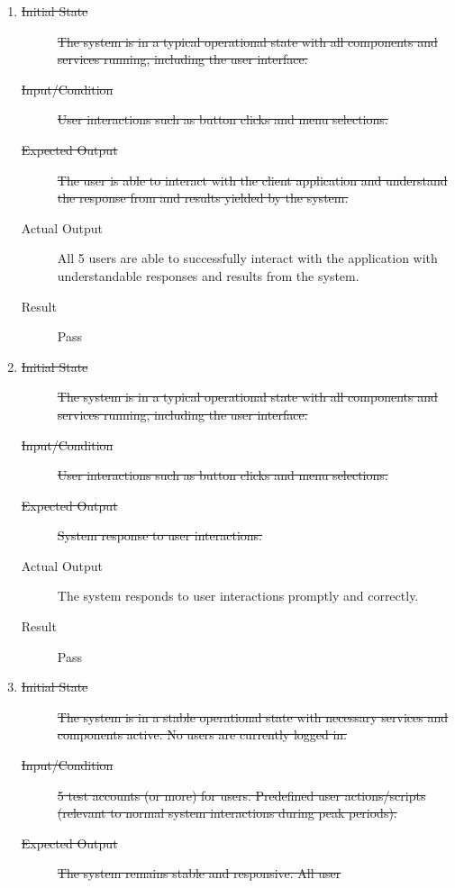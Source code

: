 \documentclass[12pt, titlepage]{article}
\begin{document}
\begin{enumerate}[NFR-T1]
  \item \label{NFRT1}
    \begin{description}
    \item[\sout{Initial State}]\sout{ The system is in a typical operational state with all
      components and services running, including the user interface.
    }
		\item[\sout{Input/Condition}]\sout{ User interactions such as button clicks and menu
      selections.
    }
		\item[\sout{Expected Output}]\sout{ The user is able to interact with the client application
      and understand the response from and results yielded by the system.
    }
		\item[Actual Output] All 5 users are able to successfully interact with the
      application with understandable responses and results from the system.
    \item[Result] Pass
    \end{description}
  \item \label{NFRT2}
    \begin{description}
    \item[\sout{Initial State}]\sout{ The system is in a typical operational state with all
      components and services running, including the user interface.
    }
		\item[\sout{Input/Condition}]\sout{ User interactions such as button clicks and menu
      selections.
    }
		\item[\sout{Expected Output}]\sout{ System response to user interactions.
    }
		\item[Actual Output] The system responds to user interactions promptly and
      correctly.
    \item[Result] Pass
    \end{description}
  \item \label{NFRT3}
    \begin{description}
    \item[\sout{Initial State}]\sout{ The system is in a stable operational state with necessary
      services and components active. No users are currently logged in.
    }
		\item[\sout{Input/Condition}]\sout{ 5 test accounts (or more) for users. Predefined user
      actions/scripts (relevant to normal system interactions during peak
      periods).
    }
		\item[\sout{Expected Output}]\sout{ The system remains stable and responsive. All user
}
\end{description}
\end{enumerate}
\end{document}
